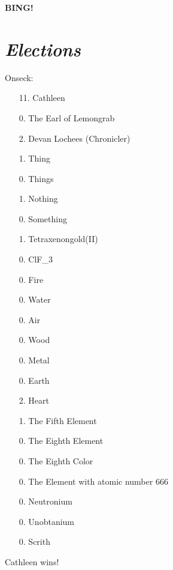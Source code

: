 \documentclass[10pt]{article}
\newcommand{\bing}{{\bf BING!} }
\newcommand{\goto}[1]{\bing \vskip 12pt \section*{{\em{#1}}}}
\begin{document}
\goto{Elections}
Onseck:
\begin{itemize}
  \item[11.] Cathleen
  \item[0.] The Earl of Lemongrab
  \item[2.] Devan Lochees (Chronicler)
  \item[1.] Thing
  \item[0.] Things
  \item[1.] Nothing
  \item[0.] Something
  \item[1.] Tetraxenongold(II)
  \item[0.] ClF_{3}
  \item[0.] Fire
  \item[0.] Water
  \item[0.] Air
  \item[0.] Wood
  \item[0.] Metal
  \item[0.] Earth
  \item[2.] Heart
  \item[1.] The Fifth Element
  \item[0.] The Eighth Element
  \item[0.] The Eighth Color
  \item[0.] The Element with atomic number 666
  \item[0.] Neutronium
  \item[0.] Unobtanium
  \item[0.] Scrith
\end{itemize}

Cathleen wins! \\
\end{document}
